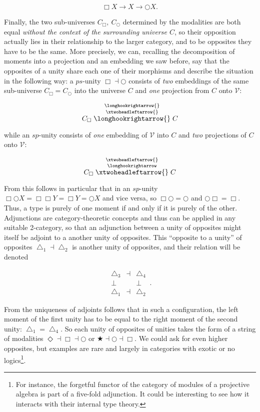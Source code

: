 \documentclass{article}
\begin{document}
$$\Box X\rightarrow X \rightarrow\bigcirc X.$$

Finally, the two sub-universes $C_\Box ,\ C_\bigcirc$ determined by the modalities are both equal \emph{without the context of the surrounding universe $C$}, so their opposition actually lies in their relationship to the larger category, and to be opposites they have to be the same. More precisely, we can, recalling the decomposition of moments into a projection and an embedding we saw before, say that the opposites of a unity share each one of their morphisms and describe the situation in the following way: a $ps$-unity $\Box\dashv\bigcirc$ consists of \emph{two} embeddings of the same sub-universe $C_\Box=C_\bigcirc$ into the universe $C$ and \emph{one} projection from $C$ onto $\mathcal{V}$:

$$C_\Box\stackrel{\longhookrightarrow{}}{\stackrel{\xtwoheadleftarrow{}}{\longhookrightarrow{}}}C$$

while an $sp$-unity consists of \emph{one} embedding of $\mathcal{V}$ into $C$ and \emph{two} projections of $C$ onto $\mathcal{V}$:

$$C_\Box\stackrel{\xtwoheadleftarrow{}}{\stackrel{\longhookrightarrow}{\xtwoheadleftarrow{}}}C$$

From this follows in particular that in an $sp$-unity $\Box\bigcirc X=\Box\Box Y=\Box Y= \bigcirc X$ and vice versa, so $\Box\bigcirc=\bigcirc$ and $\bigcirc\Box=\Box$. Thus, a type is purely of one moment if and only if it is purely of the other. \\

Adjunctions are category-theoretic concepts and thus can be applied in any suitable 2-category, so that an adjunction between a unity of opposites might itself be adjoint to a another unity of opposites\cite{Shu}. This ``opposite to a unity'' of opposites $\bigtriangleup_1\dashv\bigtriangleup_2$ is another unity of opposites, and their relation will be denoted 


$$
  \begin{array}{ccc}
    \bigtriangleup_3 &\dashv& \bigtriangleup_4
    \\
    \bot & & \bot
    \\
    \bigtriangleup_1 &\dashv& \bigtriangleup_2
    \end{array}
  \,.
$$

From the uniqueness of adjoints follows that in such a configuration, the left moment of the first unity has to be equal to the right moment of the second unity: $\bigtriangleup_1=\bigtriangleup_4$. So each unity of opposites of unities takes the form of a string of modalities $\Diamond\dashv\Box\dashv\bigcirc$ or $\bigstar\dashv\bigcirc\dashv\Box$. We could ask for even higher opposites, but examples are rare and largely in categories with exotic or no logics\footnote{For instance, the forgetful functor of the category of modules of a projective algebra is part of a five-fold adjunction. It could be interesting to see how it interacts with their internal type theory.}. \\
\end{document}
